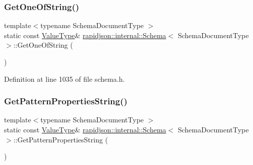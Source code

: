 \subsubsection{\texorpdfstring{GetOneOfString()}{GetOneOfString()}}
{\footnotesize\ttfamily template$<$typename Schema\+Document\+Type $>$ \\
static const \mbox{\hyperlink{classrapidjson_1_1internal_1_1_schema_a3979a9083c598195927c08c6e3ba91d1}{Value\+Type}}\& \mbox{\hyperlink{classrapidjson_1_1internal_1_1_schema}{rapidjson\+::internal\+::\+Schema}}$<$ Schema\+Document\+Type $>$\+::Get\+One\+Of\+String (\begin{DoxyParamCaption}{ }\end{DoxyParamCaption})\hspace{0.3cm}{\ttfamily [static]}}



Definition at line 1035 of file schema.\+h.


\begin{DoxyCode}{0}

\end{DoxyCode}
\mbox{\label{classrapidjson_1_1internal_1_1_schema_acbe544950cf42426b079371f96ebf88f}} 
\subsubsection{\texorpdfstring{GetPatternPropertiesString()}{GetPatternPropertiesString()}}
{\footnotesize\ttfamily template$<$typename Schema\+Document\+Type $>$ \\
static const \mbox{\hyperlink{classrapidjson_1_1internal_1_1_schema_a3979a9083c598195927c08c6e3ba91d1}{Value\+Type}}\& \mbox{\hyperlink{classrapidjson_1_1internal_1_1_schema}{rapidjson\+::internal\+::\+Schema}}$<$ Schema\+Document\+Type $>$\+::Get\+Pattern\+Properties\+String (\begin{DoxyParamCaption}{ }\end{DoxyParamCaption})\hspace{0.3cm}{\ttfamily [static]}}



